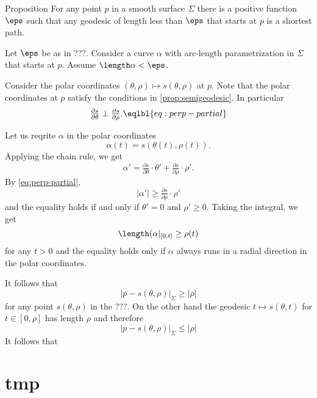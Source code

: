 \begin{thm}{Proposition}
For any point $p$ in a smooth surface $\Sigma$ there is a positive function $\eps$
such that any geodesic of length less than $\eps$ that starts at $p$ is a shortest path.  
\end{thm}

 Let $\eps$ be as in ???.
Consider a curve $\alpha$ with arc-length parametrization in $\Sigma$ that starts at $p$.
Assume $\length\alpha<\eps$.

Consider the polar coordinates $(\theta,\rho)\mapsto s(\theta,\rho)$ at $p$.
Note that the polar coordinates at $p$ satisfy the conditions in \ref{prop:semigeodesic}.
In particular
\[\tfrac{\partial s}{\partial\theta}\perp\tfrac{\partial s}{\partial\rho}.\eqlbl{eq:perp-partial}\]

Let us reqrite $\alpha$ in the polar coordinates 
\[\alpha(t)=s(\theta(t),\rho(t)).\]
Applying the chain rule, we get 
\[\alpha'=\tfrac{\partial s}{\partial\theta}\cdot\theta'+\tfrac{\partial s}{\partial\rho}\cdot\rho'.\]
By \ref{eq:perp-partial}, 
\[|\alpha'|\ge \tfrac{\partial s}{\partial\rho}\cdot\rho'\]
and the equality holds if and only if $\theta'=0$ and $\rho'\ge 0$.
Taking the integral, we get 
\[\length(\alpha|_{[0,t]}\ge\rho(t)\]
for any $t>0$ and the equality holds only if $\alpha$ always runs in a radial direction in the polar coordinates.

It follows that 
\[|p-s(\theta,\rho)|_\Sigma\ge |\rho|\]
for any point $s(\theta,\rho)$ in the ???.
On the other hand the geodesic $t\mapsto s(\theta,t)$ for $t\in[0,\rho]$ has length $\rho$ and therefore 
\[|p-s(\theta,\rho)|_\Sigma\le |\rho|\]
It follows that 































\chapter{tmp}





